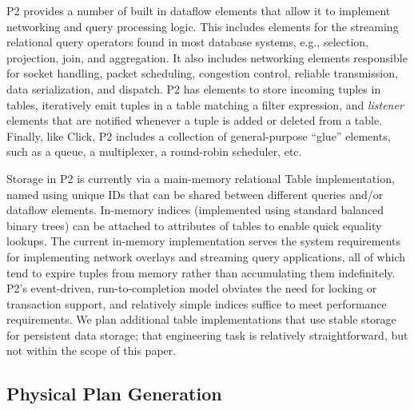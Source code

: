 \documentclass{vldb}
\begin{document}
P2 provides a number of built in dataflow elements that allow it to
implement networking and query processing logic.  This includes
elements for the streaming relational query operators found in most
database systems, e.g., selection, projection, join, and aggregation.
It also includes networking elements responsible for socket handling,
packet scheduling, congestion control, reliable transmission, data
serialization, and dispatch.  P2 has elements to store incoming tuples in tables, 
iteratively emit tuples in a table matching a filter expression, and {\em listener}
elements that are notified whenever a tuple is added or deleted from a
table. Finally, like Click, P2 includes a collection of general-purpose
``glue'' elements, such as a queue, a multiplexer, a round-robin
scheduler, etc.

Storage in P2 is currently via a main-memory relational Table
implementation, named using unique IDs that can be shared between
different queries and/or dataflow elements.  In-memory indices
(implemented using standard balanced binary trees) can be attached to
attributes of tables to enable quick equality lookups.  The current
in-memory implementation serves the system requirements for implementing
network overlays and streaming query applications, all of which tend
to expire tuples from memory rather than accumulating them
indefinitely.  P2's event-driven, run-to-completion model obviates the
need for locking or transaction support, and relatively simple indices
suffice to meet performance requirements.  We plan additional
table implementations that use stable storage for persistent data
storage; that engineering task is relatively straightforward, but not
within the scope of this paper.

\subsection{Physical Plan Generation}
\end{document}
